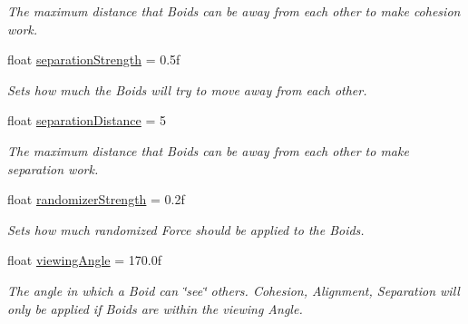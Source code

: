 \begin{DoxyCompactItemize}
\begin{DoxyCompactList}\small\item\em The maximum distance that Boids can be away from each other to make cohesion work. \end{DoxyCompactList}\item 
\mbox{\label{class_p_s_flocking_1_1_p_s_unit_manager_aa24cb0b36be539ede2aafc43952f4f03}} 
float \hyperlink{class_p_s_flocking_1_1_p_s_unit_manager_aa24cb0b36be539ede2aafc43952f4f03}{separation\+Strength} = 0.\+5f
\begin{DoxyCompactList}\small\item\em Sets how much the Boids will try to move away from each other. \end{DoxyCompactList}\item 
\mbox{\label{class_p_s_flocking_1_1_p_s_unit_manager_a8d462943657ab150dc43d8007e8d52d0}} 
float \hyperlink{class_p_s_flocking_1_1_p_s_unit_manager_a8d462943657ab150dc43d8007e8d52d0}{separation\+Distance} = 5
\begin{DoxyCompactList}\small\item\em The maximum distance that Boids can be away from each other to make separation work. \end{DoxyCompactList}\item 
\mbox{\label{class_p_s_flocking_1_1_p_s_unit_manager_a7d2b62844ac4629ec9d6d90327741768}} 
float \hyperlink{class_p_s_flocking_1_1_p_s_unit_manager_a7d2b62844ac4629ec9d6d90327741768}{randomizer\+Strength} = 0.\+2f
\begin{DoxyCompactList}\small\item\em Sets how much randomized Force should be applied to the Boids. \end{DoxyCompactList}\item 
\mbox{\label{class_p_s_flocking_1_1_p_s_unit_manager_a8b2bb3c41213b2298582fa2f195e394a}} 
float \hyperlink{class_p_s_flocking_1_1_p_s_unit_manager_a8b2bb3c41213b2298582fa2f195e394a}{viewing\+Angle} = 170.\+0f
\begin{DoxyCompactList}\small\item\em The angle in which a Boid can \char`\"{}see\char`\"{} others. Cohesion, Alignment, Separation will only be applied if Boids are within the viewing Angle. \end{DoxyCompactList}\end{DoxyCompactItemize}
